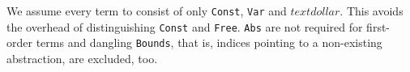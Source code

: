 We assume every term to consist of only \verb!Const!, \verb!Var! and $textdollar$. This avoids the overhead of distinguishing \verb!Const! and \verb!Free!. \verb!Abs! are not required for first-order terms and dangling \verb!Bounds!, that is, indices pointing to a non-existing abstraction, are excluded, too.


